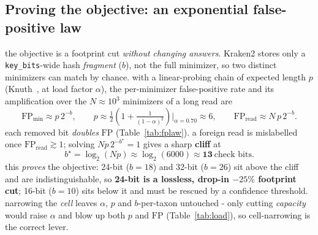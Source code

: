 \documentclass[10.5pt]{article}
\newcommand{\code}[1]{\texttt{\footnotesize #1}}
\begin{document}
\subsection{Proving the objective: an exponential false-positive law}
the objective is a footprint cut \emph{without changing answers}. Kraken2 stores only a \code{key\_bits}-wide hash \textit{fragment} ($b$), not the full minimizer, so two distinct minimizers can match by chance. with a linear-probing chain of expected length $p$ (Knuth~\cite{knuth}, at load factor $\alpha$), the per-minimizer false-positive rate and its amplification over the $N\!\approx\!10^3$ minimizers of a long read are
\begin{equation}
\mathrm{FP}_{\text{min}} \approx p\,2^{-b},\qquad
p \approx \tfrac12\!\left(1+\tfrac{1}{(1-\alpha)^2}\right)\Big|_{\alpha=0.70}\!\!\approx 6,\qquad
\mathrm{FP}_{\text{read}} \approx N\,p\,2^{-b}.
\label{eq:fp}
\end{equation}
each removed bit \emph{doubles} $\mathrm{FP}$ (Table~\ref{tab:fplaw}). a foreign read is mislabelled once $\mathrm{FP}_{\text{read}}\!\gtrsim\!1$; solving $N p\,2^{-b^\star}\!=\!1$ gives a sharp \textbf{cliff} at
\begin{equation}
b^\star = \log_2(Np) \approx \log_2(6000) \approx \mathbf{13}\ \text{check bits.}
\label{eq:cliff}
\end{equation}
this \emph{proves} the objective: 24-bit ($b{=}18$) and 32-bit ($b{=}26$) sit above the cliff and are indistinguishable, so \textbf{24-bit is a lossless, drop-in $-25\%$ footprint cut}; 16-bit ($b{=}10$) sits below it and must be rescued by a confidence threshold. narrowing the \emph{cell} leaves $\alpha$, $p$ and $b$-per-taxon untouched - only cutting \emph{capacity} would raise $\alpha$ and blow up both $p$ and $\mathrm{FP}$ (Table~\ref{tab:load}), so cell-narrowing is the correct lever.
\end{document}
